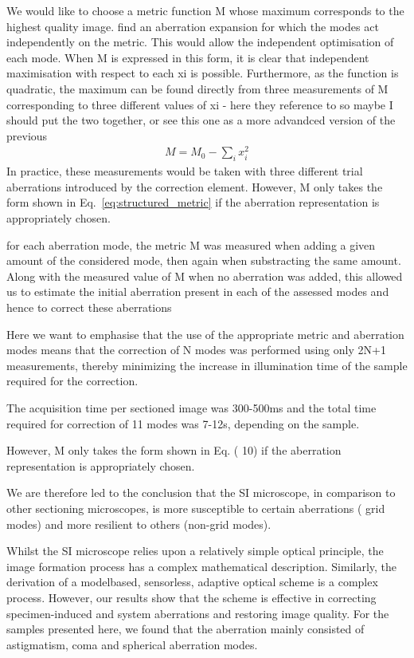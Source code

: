 We would like to choose a metric function M whose maximum corresponds to the 
highest quality image.
find an aberration expansion for which the modes act independently on the 
metric.
This would allow the independent optimisation of each mode.
When M is expressed in this form, it is clear that independent maximisation 
with respect to each xi is possible. Furthermore, as the function is 
quadratic, the maximum can be found directly from three measurements of M 
corresponding to three different values of xi - here they reference to \cite{
wide_AOM_loew_freq} so maybe I should put the two together, or see this one 
as a more advandced version of the previous
\begin{align}
	M = M_0 - \sum_i{x_i^2}
	\label{eq:structured_metric}
\end{align}
In practice, these measurements would be taken with three different trial 
aberrations introduced by the correction element. However, M only takes the 
form shown in Eq.~\eqref{eq:structured_metric} if the aberration 
representation is appropriately chosen. 

for each aberration mode, the metric M was measured when adding a given 
amount of the considered mode, then again when substracting the same amount. 
Along with the measured value of M when no aberration was added, this allowed 
us to estimate the initial aberration present in each of the assessed modes 
and hence to correct these aberrations

Here we want to emphasise that the use of the appropriate metric and 
aberration modes means that the correction of N modes was performed using 
only 2N+1 measurements, thereby minimizing the increase in illumination time 
of the sample required for the correction.

The acquisition time per sectioned image was 300-500ms and the total time 
required for correction of 11 modes was 7-12s, depending on the sample.


However, M only takes the form shown in Eq. ( 10) if the aberration 
representation is appropriately chosen.


We are therefore led to the conclusion that the SI microscope, in comparison 
to other sectioning microscopes, is more susceptible to certain aberrations (
grid modes) and more resilient to others (non-grid modes).

Whilst the SI microscope relies upon a relatively simple optical principle, 
the image formation process has a complex mathematical description. 
Similarly, the derivation of a modelbased, sensorless, adaptive optical 
scheme is a complex process. However, our results show that the scheme is 
effective in correcting specimen-induced and system aberrations and restoring 
image quality. For the samples presented here, we found that the aberration 
mainly consisted of astigmatism, coma and spherical aberration modes.

